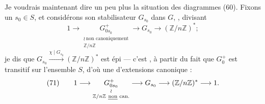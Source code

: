 \documentclass[11pt,a4paper]{article}
\begin{document}

Je voudrais maintenant dire un peu plus la situation des diagrammes (60). Fixons un $s_0 \in S$, et considérons son stabilisateur \struck{\ill{}} $G_{s_0}$ dans $G$, , divisant
\[
1 \longrightarrow \underset{\substack{\wr\ \text{non canoniquement} \\ \mathbb{Z}/n\mathbb{Z}}}{G^{+}_{0 s_0}} \longrightarrow G_{s_0} \longrightarrow (\mathbb{Z}/n\mathbb{Z})^{*} ;
\]
je dis que $G_{s_0} \xrightarrow{\chi \mid G_{s_0}} (\mathbb{Z}/n\mathbb{Z})^{*}$ est épi — c'est , à partir du fait que $G_0^{+}$ est transitif sur l'ensemble $S$, d'où une  d'extensions canonique :
\[
(71) \qquad 1 \longrightarrow \underset{\substack{\wr \\ \mathbb{Z}/n\mathbb{Z}\ \text{\emph{non} can.}}}{G^{+}_{0 s_0}} \longrightarrow G_{s_0} \longrightarrow (\mathbb{Z}/n\mathbb{Z})^{*} \longrightarrow 1 .
\]
\end{document}

